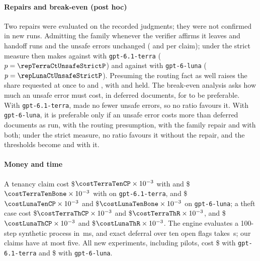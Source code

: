 \paragraph{Repairs and break-even (post hoc)}
Two repairs were evaluated on the recorded judgments; they were not confirmed in new runs. Admitting the family whenever the verifier affirms it leaves \repTerraHandoffRuns{} and \repLunaHandoffRuns{} handoff runs and the unsafe errors unchanged (\repTerraUnsafe{} and \repLunaUnsafe{} per claim); under the strict measure \casepath then makes \repTerraUnsafeStrict{} against \repTerraCtUnsafeStrictB{} with \texttt{gpt-6.1-terra} ($p=\repTerraCtUnsafeStrictP$) and \repLunaUnsafeStrict{} against \repLunaCtUnsafeStrictB{} with \texttt{gpt-6-luna} ($p=\repLunaCtUnsafeStrictP$). Presuming the routing fact as well raises the share requested at once to \pct{\repPresTerraRecall} and \pct{\repPresLunaRecall}, with \pct{\repPresTerraHeld} and \pct{\repPresLunaHeld} held. The break-even analysis asks how much an unsafe error must cost, in deferred documents, for \casepath to be preferable. With \texttt{gpt-6.1-terra}, \casepath made no fewer unsafe errors, so no ratio favours it. With \texttt{gpt-6-luna}, it is preferable only if an unsafe error costs more than \beLunaCPxRatio{} deferred documents as run, \beLunaCPrRatio{} with the routing presumption, \repLunaRatio{} with the family repair and \repPresLunaRatio{} with both; under the strict measure, no ratio favours it without the repair, and the thresholds become \repLunaRatioStrict{} and \repPresLunaRatioStrict{} with it.

\paragraph{Money and time}
A tenancy claim cost \$$\costTerraTenCP\times10^{-3}$ with \casepath and \$$\costTerraTenBone\times10^{-3}$ with  on \texttt{gpt-6.1-terra}, and \$$\costLunaTenCP\times10^{-3}$ and \$$\costLunaTenBone\times10^{-3}$ on \texttt{gpt-6-luna}; a theft case cost \$$\costTerraThCP\times10^{-3}$ and \$$\costTerraThR\times10^{-3}$, and \$$\costLunaThCP\times10^{-3}$ and \$$\costLunaThR\times10^{-3}$. The engine evaluates a 100-step synthetic process in \scaleHundredMs{}\,ms, and exact deferral over ten open flags takes \scaleExactTen{}\,s; our claims have at most five. All new experiments, including pilots, cost \$\spendTerra{} with \texttt{gpt-6.1-terra} and \$\spendLuna{} with \texttt{gpt-6-luna}.
